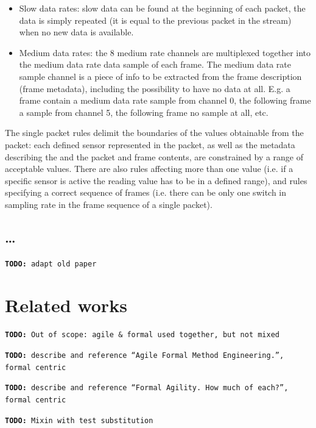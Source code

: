 \documentclass{article} \usepackage{times}
\newcommand{\todo}[1]{\texttt{\textbf{TODO:} #1}}
\begin{document}
\begin{itemize}
\item Slow data rates: slow data can be found at the beginning of each packet, the data is simply repeated (it is equal to the previous packet in the stream) when no new data is available.
\item Medium data rates: the 8 medium rate channels are multiplexed together into the medium data rate data sample of each frame. The medium data rate sample channel is a piece of info to be extracted from the frame description (frame metadata), including the possibility to have no data at all. 
E.g. a frame contain a medium data rate sample from channel 0, the following frame a sample from channel 5, the following frame no sample at all, etc.
\end{itemize}

The single packet rules delimit the boundaries of the values obtainable from the packet: each defined sensor represented in the packet, as well as the metadata describing the \STSB and the packet and frame contents, are constrained by a range of acceptable values.
There are also rules affecting more than one value (i.e. if a specific sensor is active the reading value has to be in a defined range), and rules specifying a correct sequence of frames (i.e. there can be only one switch in sampling rate in the frame sequence of a single packet).


\subsection{\ldots}

\todo{adapt old paper}



\section{Related works}
\label{sec:related_works}

\todo{Out of scope: agile & formal used together, but not mixed}

\todo{describe and reference ``Agile Formal Method Engineering.'', formal centric}

\todo{describe and reference ``Formal Agility. How much of each?'', formal centric}

\todo{Mixin with test substitution}



\end{document}
